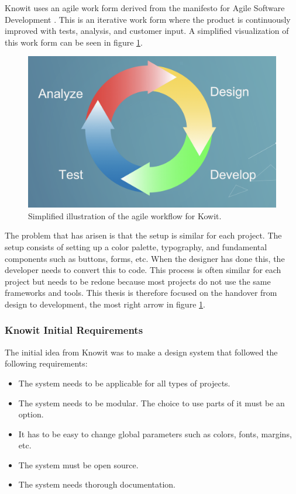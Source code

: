 Knowit uses an agile work form derived from the manifesto for Agile Software Development \cite{ManifestoAgileSoftware}. This is an iterative work form where the product is continuously improved with tests, analysis, and customer input. A simplified visualization of this work form can be seen in figure \ref{fig:agile}.

\begin{figure}[H]
  \centering
  \includegraphics[width=0.8\linewidth]{images/agile.png}
  \caption{Simplified illustration of the agile workflow for Kowit.}%
  \label{fig:agile}
\end{figure}

The problem that has arisen is that the setup is similar for each project. The setup consists of setting up a color palette, typography, and fundamental components such as buttons, forms, etc. When the designer has done this, the developer needs to convert this to code. This process is often similar for each project but needs to be redone because most projects do not use the same frameworks and tools. This thesis is therefore focused on the handover from design to development, the most right arrow in figure \ref{fig:agile}.

\subsubsection{Knowit Initial Requirements}%
\label{ssub:Knowit Initial Requirements}
The initial idea from Knowit was to make a design system\cite{fanguyComprehensiveGuideDesign} that followed the following requirements:
\begin{itemize}
  \item The system needs to be applicable for all types of projects.
  \item The system needs to be modular. The choice to use parts of it must be an option.
  \item It has to be easy to change global parameters such as colors, fonts, margins, etc.
  \item The system must be open source.
  \item The system needs thorough documentation.
\end{itemize}

